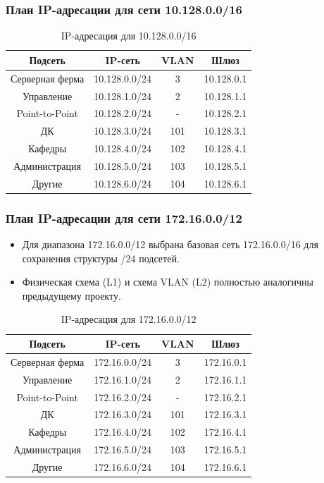 \begin{frame}
\frametitle{План IP-адресации для сети 10.128.0.0/16}
\begin{table}[h]
\centering
\caption{IP-адресация для 10.128.0.0/16}
\begin{tabular}{|c|c|c|c|}
\hline
\textbf{Подсеть} & \textbf{IP-сеть} & \textbf{VLAN} & \textbf{Шлюз} \\
\hline
Серверная ферма & 10.128.0.0/24 & 3 & 10.128.0.1 \\
Управление & 10.128.1.0/24 & 2 & 10.128.1.1 \\
Point-to-Point & 10.128.2.0/24 & - & 10.128.2.1 \\
ДК & 10.128.3.0/24 & 101 & 10.128.3.1 \\
Кафедры & 10.128.4.0/24 & 102 & 10.128.4.1 \\
Администрация & 10.128.5.0/24 & 103 & 10.128.5.1 \\
Другие & 10.128.6.0/24 & 104 & 10.128.6.1 \\
\hline
\end{tabular}
\end{table}
\end{frame}

\begin{frame}
\frametitle{План IP-адресации для сети 172.16.0.0/12}
\begin{itemize}
    \item Для диапазона 172.16.0.0/12 выбрана базовая сеть 172.16.0.0/16 для сохранения структуры /24 подсетей.
    \item Физическая схема (L1) и схема VLAN (L2) полностью аналогичны предыдущему проекту.
\end{itemize}
\begin{table}[h]
\centering
\caption{IP-адресация для 172.16.0.0/12}
\begin{tabular}{|c|c|c|c|}
\hline
\textbf{Подсеть} & \textbf{IP-сеть} & \textbf{VLAN} & \textbf{Шлюз} \\
\hline
Серверная ферма & 172.16.0.0/24 & 3 & 172.16.0.1 \\
Управление & 172.16.1.0/24 & 2 & 172.16.1.1 \\
Point-to-Point & 172.16.2.0/24 & - & 172.16.2.1 \\
ДК & 172.16.3.0/24 & 101 & 172.16.3.1 \\
Кафедры & 172.16.4.0/24 & 102 & 172.16.4.1 \\
Администрация & 172.16.5.0/24 & 103 & 172.16.5.1 \\
Другие & 172.16.6.0/24 & 104 & 172.16.6.1 \\
\hline
\end{tabular}
\end{table}
\end{frame}

